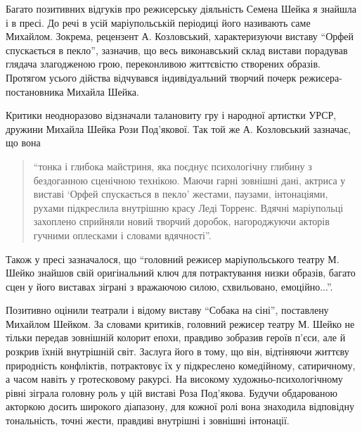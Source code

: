 
Багато позитивних відгуків про режисерську діяльність Семена Шейка я знайшла і
в пресі. До речі в усій маріупольській періодиці його називають саме Михайлом.
Зокрема, рецензент А. Козловський, характеризуючи виставу \enquote{Орфей спускається в
пекло}, зазначив, що весь виконавський склад вистави порадував глядача
злагодженою грою, переконливою життєвістю створених образів. Протягом усього
дійства відчувався індивідуальний творчий почерк режисера-постановника Михайла
Шейка.


Критики неодноразово відзначали талановиту гру і  народної артистки УРСР,
дружини Михайла Шейка Рози Под'якової. Так той же А. Козловський зазначає, що
вона 
\begin{quote}
\enquote{тонка і глибока майстриня, яка поєднує психологічну глибину з бездоганною
сценічною технікою. Маючи гарні зовнішні дані, актриса у виставі \enquote{Орфей
спускається в пекло} жестами, паузами, інтонаціями, рухами підкреслила
внутрішню красу Леді Торренс. Вдячні маріупольці захоплено сприйняли новий
творчий доробок, нагороджуючи акторів гучними оплесками і словами вдячності}.
\end{quote}


Також у пресі зазначалося, що \enquote{головний режисер маріупольського театру М. Шейко
знайшов свій оригінальний ключ для потрактування низки образів, багато сцен у
його виставах зіграні з вражаючою силою, схвильовано, емоційно...}.


Позитивно оцінили театрали і відому виставу \enquote{Собака на сіні}, поставлену
Михайлом Шейком. За словами критиків, головний режисер театру М. Шейко не
тільки передав зовнішній колорит епохи, правдиво зобразив героїв п'єси, але й
розкрив їхній внутрішній світ. Заслуга його в тому, що він, відтіняючи життєву
природність конфліктів, потрактовує їх у підкреслено комедійному, сатиричному,
а часом навіть у гротесковому ракурсі. На високому художньо-психологічному
рівні зіграла головну роль у цій виставі Роза Под'якова. Будучи обдарованою
акторкою досить широкого діапазону, для кожної ролі вона знаходила відповідну
тональність, точні жести, правдиві внутрішні і зовнішні інтонації.

